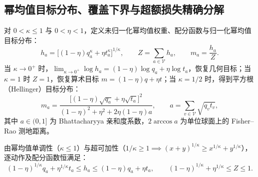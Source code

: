\documentclass[lang=cn,scheme=chinese,openany]{elegantbook}
\begin{document}
\subsection{幂均值目标分布、覆盖下界与超额损失精确分解}

对 $0<\kappa\le 1$ 与 $0<\eta<1$，定义未归一化幂均值权重、配分函数与归一化幂均值目标分布：
\begin{equation}
 h_a=\bigl[(1-\eta)q_a^\kappa+\eta t_a^\kappa\bigr]^{1/\kappa},\qquad
 Z=\sum_{a\in\mathcal V} h_a,\qquad m_a=\frac{h_a}{Z}.
 \label{eq:proximal-power-target}
\end{equation}
当 $\kappa\to 0^+$ 时，$\lim_{\kappa\to 0^+}\log h_a=(1-\eta)\log q_a+\eta\log t_a$，恢复几何目标；当 $\kappa=1$ 时 $Z=1$，恢复算术目标 $m=(1-\eta)q+\eta t$；当 $\kappa=1/2$ 时，得到平方根（Hellinger）目标分布：
\begin{equation}
 m_a=\frac{\bigl[(1-\eta)\sqrt{q_a}+\eta\sqrt{t_a}\bigr]^2}
 {(1-\eta)^2+\eta^2+2\eta(1-\eta)a},\qquad
 a=\sum_{v\in\mathcal V}\sqrt{q_v t_v},
 \label{eq:proximal-square-root}
\end{equation}
其中 $a\in(0,1]$ 为 Bhattacharyya 亲和度系数，$2\arccos a$ 为单位球面上的 Fisher--Rao 测地距离。

由幂均值单调性（$\kappa\le 1$）与超可加性（$1/\kappa\ge 1\implies (x+y)^{1/\kappa}\ge x^{1/\kappa}+y^{1/\kappa}$），逐动作及配分函数恒满足：
\begin{equation}
 (1-\eta)^{1/\kappa}q_a+\eta^{1/\kappa}t_a\le h_a\le(1-\eta)q_a+\eta t_a,
 \qquad
 (1-\eta)^{1/\kappa}+\eta^{1/\kappa}\le Z\le 1.
\end{equation}
\end{document}
